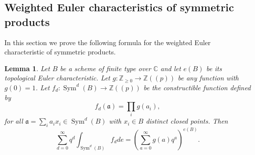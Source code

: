 \documentclass{amsart}
\newtheorem{lemma}[theorem]{Lemma}
\theoremstyle{definition}
\newcommand{\CC} {\mathbb{C}}          %
\newcommand{\ZZ} {\mathbb{Z}}		%
\newcommand{\Sym}{\operatorname{Sym}}
\begin{document}
\subsection{Weighted Euler characteristics of symmetric products} \label{power}

In this section we prove the following formula for the weighted Euler
characteristic of symmetric products.

\begin{lemma}\label{lem: formula for euler char of sym products}
Let $B$ be a scheme of finite type over $\CC $ and let $e (B)$ be its
topological Euler characteristic. Let $g:\ZZ _{\geq 0}\to \ZZ (\!(p)\!)$
be any function with $g (0)=1$. Let $f_{d}:\Sym ^{d} (B)\to \ZZ (\!(p)\!)$
be the constructible function defined by $$f_{d} (\mathfrak{a})=\prod _{i}g (a_{i}),$$ for all $\mathfrak{a} = \sum_{i}
a_{i}x_{i} \in \Sym^d(B)$ with $x_i \in B$ distinct closed points. Then
\[
\sum _{d=0}^{\infty } q^{d} \int _{\Sym ^{d} (B)} f_{d} de =
\left(\sum _{a=0}^{\infty }g (a) q^{a} \right)^{e (B)}.
\]
\end{lemma}
\end{document}
